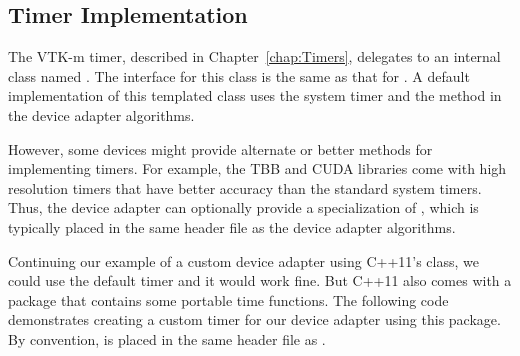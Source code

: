 
\subsection{Timer Implementation}


The VTK-m timer, described in Chapter~\ref{chap:Timers}, delegates to an
internal class named . The
interface for this class is the same as that for . A default
implementation of this templated class uses the system timer and the
 method in the device adapter algorithms.

However, some devices might provide alternate or better methods for
implementing timers. For example, the TBB and CUDA libraries come with high
resolution timers that have better accuracy than the standard system
timers. Thus, the device adapter can optionally provide a specialization of
, which is typically
placed in the same header file as the device adapter algorithms.

Continuing our example of a custom device adapter using C++11's
 class, we could use the default timer and it would
work fine. But C++11 also comes with a  package that
contains some portable time functions. The following code demonstrates
creating a custom timer for our device adapter using this package. By
convention,  is placed in
the same header file as .




